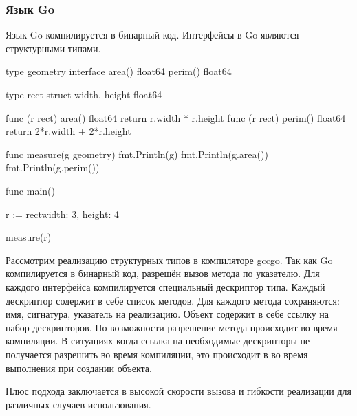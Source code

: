 \subsubsection{Язык Go}
Язык Go компилируется в бинарный код. Интерфейсы в Go являются структурными типами\cite{go}.

\begin{pyglist}[language=go]
type geometry interface {
    area() float64
    perim() float64
}

type rect struct {
    width, height float64
}

func (r rect) area() float64 {
    return r.width * r.height
}
func (r rect) perim() float64 {
    return 2*r.width + 2*r.height
}

func measure(g geometry) {
    fmt.Println(g)
    fmt.Println(g.area())
    fmt.Println(g.perim())
}

func main() {
    r := rect{width: 3, height: 4}

    measure(r)
}
\end{pyglist}

Рассмотрим реализацию структурных типов в компиляторе gccgo. Так как Go компилируется в бинарный код, разрешён вызов метода по указателю. Для каждого интерфейса компилируется специальный дескриптор типа. Каждый дескриптор содержит в себе список методов. Для каждого метода сохраняются: имя, сигнатура, указатель на реализацию. Объект содержит в себе ссылку на набор дескрипторов. По возможности разрешение метода происходит во время компиляции. В ситуациях когда ссылка на необходимые дескрипторы не получается разрешить во время компиляции, это происходит в во время выполнения при создании объекта.

Плюс подхода заключается в высокой скорости вызова и гибкости реализации для различных случаев использования.
